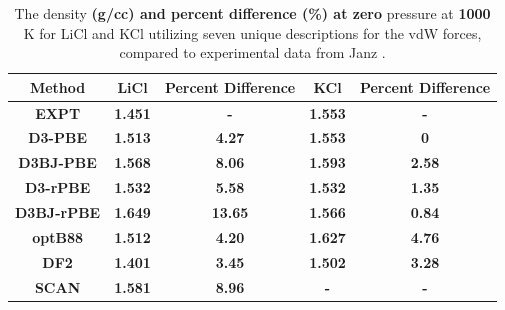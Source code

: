 \documentclass[review]{elsarticle}
\providecommand{\DIFaddtex}[1]{{\bf #1}} %
\providecommand{\DIFdeltex}[1]{} %
\providecommand{\DIFaddbegin}{\protect\color{blue}} %
\providecommand{\DIFaddend}{\protect\color{black}} %
\providecommand{\DIFdelbegin}{\protect\color{red}} %
\providecommand{\DIFdelend}{\protect\color{black}} %
\providecommand{\DIFaddFL}[1]{\DIFadd{#1}} %
\providecommand{\DIFdelFL}[1]{\DIFdel{#1}} %
\providecommand{\DIFaddbeginFL}{} %
\providecommand{\DIFaddendFL}{} %
\providecommand{\DIFdelbeginFL}{} %
\providecommand{\DIFdelendFL}{} %
\providecommand{\DIFadd}[1]{\texorpdfstring{\DIFaddtex{#1}}{#1}} %
\providecommand{\DIFdel}[1]{\texorpdfstring{\DIFdeltex{#1}}{}} %
\newcommand{\DIFscaledelfig}{0.5}
\newlength{\DIFdelgraphicswidth} %
\newlength{\DIFdelgraphicsheight} %
\newcommand{\DIFaddincludegraphics}[2][]{{\color{blue}\fbox{\DIFOincludegraphics[#1]{#2}}}} %
\newcommand{\DIFdelincludegraphics}[2][]{%
\sbox{\DIFdelgraphicsbox}{\DIFOincludegraphics[#1]{#2}}%
\settoboxwidth{\DIFdelgraphicswidth}{\DIFdelgraphicsbox} %
\settoboxtotalheight{\DIFdelgraphicsheight}{\DIFdelgraphicsbox} %
\scalebox{\DIFscaledelfig}{%
\parbox[b]{\DIFdelgraphicswidth}{\usebox{\DIFdelgraphicsbox}\\[-\baselineskip] \rule{\DIFdelgraphicswidth}{0em}}\llap{\resizebox{\DIFdelgraphicswidth}{\DIFdelgraphicsheight}{%
\setlength{\unitlength}{\DIFdelgraphicswidth}%
\begin{picture}(1,1)%
\thicklines\linethickness{2pt} %
{\color[rgb]{1,0,0}\put(0,0){\framebox(1,1){}}}%
{\color[rgb]{1,0,0}\put(0,0){\line( 1,1){1}}}%
{\color[rgb]{1,0,0}\put(0,1){\line(1,-1){1}}}%
\end{picture}%
}\hspace*{3pt}}} %
} %
\DeclareRobustCommand{\DIFaddbegin}{\DIFOaddbegin \let\includegraphics\DIFaddincludegraphics} %
\DeclareRobustCommand{\DIFaddend}{\DIFOaddend \let\includegraphics\DIFOincludegraphics} %
\DeclareRobustCommand{\DIFdelbegin}{\DIFOdelbegin \let\includegraphics\DIFdelincludegraphics} %
\DeclareRobustCommand{\DIFdelend}{\DIFOaddend \let\includegraphics\DIFOincludegraphics} %
\DeclareRobustCommand{\DIFaddbeginFL}{\DIFOaddbeginFL \let\includegraphics\DIFaddincludegraphics} %
\DeclareRobustCommand{\DIFaddendFL}{\DIFOaddendFL \let\includegraphics\DIFOincludegraphics} %
\DeclareRobustCommand{\DIFdelbeginFL}{\DIFOdelbeginFL \let\includegraphics\DIFdelincludegraphics} %
\DeclareRobustCommand{\DIFdelendFL}{\DIFOaddendFL \let\includegraphics\DIFOincludegraphics} %
\begin{document}
\DIFdelbegin %
\DIFdelendFL \DIFaddbeginFL \begin{table}[]
    \DIFaddendFL \centering
    \DIFdelbeginFL %
\DIFdelendFL \DIFaddbeginFL \begin{tabular}{|c|c|c|c|c|}
\hline
\DIFaddFL{Method	}&	\DIFaddFL{LiCl	}& \DIFaddFL{Percent Difference }&	\DIFaddFL{KCl }& \DIFaddFL{Percent Difference	}\\
\hline
\DIFaddFL{EXPT	}&	\DIFaddFL{1.451	}& \DIFaddFL{-}&	\DIFaddFL{1.553 }&\DIFaddFL{-	}\\
\DIFaddFL{D3-PBE	}&	\DIFaddFL{1.513	}& \DIFaddFL{4.27}&	\DIFaddFL{1.553 }& \DIFaddFL{0	}\\
\DIFaddFL{D3BJ-PBE	}&	\DIFaddFL{1.568 }&	\DIFaddFL{8.06}&	\DIFaddFL{1.593 }& \DIFaddFL{2.58	}\\
\DIFaddFL{D3-rPBE	}&	\DIFaddFL{1.532	}& \DIFaddFL{5.58}&	\DIFaddFL{1.532 }& \DIFaddFL{1.35	}\\
\DIFaddFL{D3BJ-rPBE	}&	\DIFaddFL{1.649 }&	\DIFaddFL{13.65}&	\DIFaddFL{1.566 }& \DIFaddFL{0.84	}\\
\DIFaddFL{optB88	}&	\DIFaddFL{1.512	}& \DIFaddFL{4.20}&	\DIFaddFL{1.627 }& \DIFaddFL{4.76	}\\
\DIFaddFL{DF2	}&	\DIFaddFL{1.401	}& \DIFaddFL{3.45}&	\DIFaddFL{1.502 }& \DIFaddFL{3.28	}\\
\DIFaddFL{SCAN }& \DIFaddFL{1.581 }& \DIFaddFL{8.96}& \DIFaddFL{-}&\DIFaddFL{- }\\
\hline
    \end{tabular}
    \DIFaddendFL \caption{The density \DIFdelbeginFL \DIFdelFL{as a function of }\DIFdelendFL \DIFaddbeginFL \DIFaddFL{(g/cc) and percent difference (\%) at zero }\DIFaddendFL pressure at \DIFdelbeginFL \DIFdelFL{1100 }\DIFdelendFL \DIFaddbeginFL \DIFaddFL{1000 }\DIFaddendFL K for LiCl and KCl utilizing seven unique descriptions for the vdW forces, compared to experimental data from Janz \DIFdelbeginFL \DIFdelFL{\cite{Janz1988}}\DIFdelendFL \DIFaddbeginFL \DIFaddFL{\cite{janz1975molten,van1955electrical}}\DIFaddendFL . }
    \DIFdelbeginFL %
\DIFdelend \DIFaddbegin \label{tab:my_label}
\end{table}
\DIFaddend 
\end{document}

